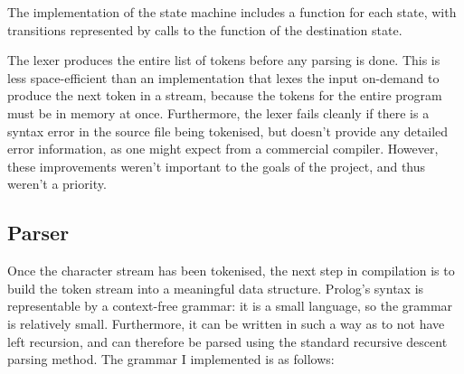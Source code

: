 \documentclass[12pt]{article}
\begin{document}
The implementation of the state machine includes a function for each state, with transitions represented by calls to the function of the destination state.

The lexer produces the entire list of tokens before any parsing is done. 
This is less space-efficient than an implementation that lexes the input on-demand to produce the next token in a stream, because the tokens for the entire program must be in memory at once. 
Furthermore, the lexer fails cleanly if there is a syntax error in the source file being tokenised, but doesn't provide any detailed error information, as one might expect from a commercial compiler. 
However, these improvements weren't important to the goals of the project, and thus weren't a priority.

\subsection{Parser}

Once the character stream has been tokenised, the next step in compilation is to build the token stream into a meaningful data structure. 
Prolog's syntax is representable by a context-free grammar: it is a small language, so the grammar is relatively small. 
Furthermore, it can be written in such a way as to not have left recursion, and can therefore be parsed using the standard recursive descent parsing method. 
The grammar I implemented is as follows:

\newpage
\end{document}

